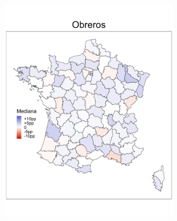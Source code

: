 \begin{figure}
\begin{subfigure}{0.235\textwidth}
	\includegraphics[width = \textwidth]{Figs/Efectos/Mapa_Efectos_CSP6_Modelo_H}
	\end{subfigure}
	~
	\begin{subfigure}{0.235\textwidth}

\end{subfigure}
\end{figure}
